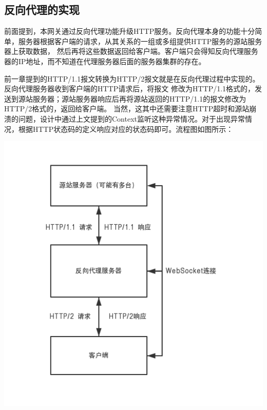 \documentclass[twoside]{CUGThesis}
\begin{document}
	\subsection{反向代理的实现}
	前面提到，本网关通过反向代理功能升级HTTP服务。反向代理本身的功能十分简单，服务器根据客户端的请求，从其关系的一组或多组提供HTTP服务的源站服务器上获取数据，
	然后再将这些数据返回给客户端。客户端只会得知反向代理服务器的IP地址，而不知道在代理服务器后面的服务器集群的存在。 \par 
	前一章提到的HTTP/1.1报文转换为HTTP/2报文就是在反向代理过程中实现的。反向代理服务器收到客户端的HTTP请求后，将报文
	修改为HTTP/1.1格式的，发送到源站服务器；源站服务器响应后再将源站返回的HTTP/1.1的报文修改为HTTP/2格式的，返回给客户端。
	当然，这其中还需要注意HTTP超时和源站崩溃的问题，设计中通过上文提到的Context监听这种异常情况。对于出现异常情况，根据HTTP状态码的定义响应对应的状态码即可。流程图如图所示：\par
	\begin{center}
	\includegraphics[scale=0.56]{Figures/reverse_proxy.png}
	\end{center}
\end{document}
